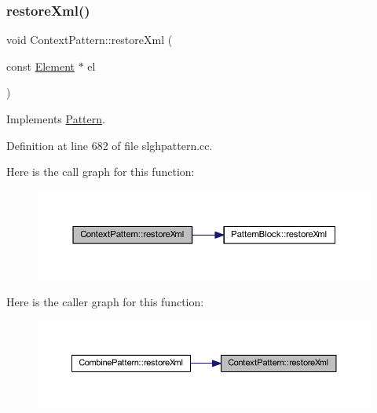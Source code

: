 \subsubsection{\texorpdfstring{restoreXml()}{restoreXml()}}
{\footnotesize\ttfamily void Context\+Pattern\+::restore\+Xml (\begin{DoxyParamCaption}\item[{const \mbox{\hyperlink{class_element}{Element}} $\ast$}]{el }\end{DoxyParamCaption})\hspace{0.3cm}{\ttfamily [virtual]}}



Implements \mbox{\hyperlink{class_pattern_aaa8fb2873854fb42d944fa8876102bb5}{Pattern}}.



Definition at line 682 of file slghpattern.\+cc.

Here is the call graph for this function\+:
\nopagebreak
\begin{figure}[H]
\begin{center}
\leavevmode
\includegraphics[width=350pt]{class_context_pattern_a0a49308ce8b3b8b66226f78911f5d0ec_cgraph}
\end{center}
\end{figure}
Here is the caller graph for this function\+:
\nopagebreak
\begin{figure}[H]
\begin{center}
\leavevmode
\includegraphics[width=350pt]{class_context_pattern_a0a49308ce8b3b8b66226f78911f5d0ec_icgraph}
\end{center}
\end{figure}
\mbox{\label{class_context_pattern_a405d7ca6e777696895091684d1debfd8}} 

